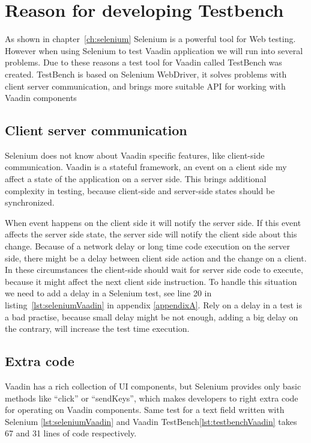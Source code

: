 \chapter{Reason for developing Testbench}
\label{ch:reasontestbenchdevelopment}
As shown in chapter~\ref{ch:selenium} Selenium is a powerful tool for Web
testing. However when using Selenium to test Vaadin application we will run into
several problems. Due to these reasons a test tool for Vaadin called TestBench was
created. TestBench is based on Selenium WebDriver, it solves  problems with client server communication,
 and brings more suitable API for working with Vaadin components

\section{Client server communication}
Selenium does not know about Vaadin specific features, like client-side	communication. 
Vaadin is a stateful framework, an event on a client side my affect a state of
the application on a server side. This brings additional complexity in testing,
because client-side and server-side states should be synchronized.

When event happens on the client side it will notify the server side.
If this event affects the server side state, the
server side will notify the client side about this change.
 Because of a network delay or long time code execution on the server side,
 there might be a delay between client side action and the change on a client. 
 In these circumstances the client-side should wait for server side code to execute,
  because it might affect the next client side instruction. To handle this
  situation we need to add a delay in a Selenium test, see line 20
   in listing~\ref{lst:seleniumVaadin} in appendix \ref{appendixA}. Rely on a
   delay in a test is a bad practise, because small delay might be not
   enough, adding a big delay on the contrary, will increase the test time
   execution.

\section{Extra code}
 Vaadin has a rich collection of UI components, but Selenium provides only
 basic methods like ``click'' or ``sendKeys'', which makes developers to right
 extra code for operating on Vaadin components. Same test for a text field
 written with Selenium \ref{lst:seleniumVaadin} and Vaadin
 TestBench\ref{lst:testbenchVaadin} takes 67 and 31 lines of code respectively.
   
